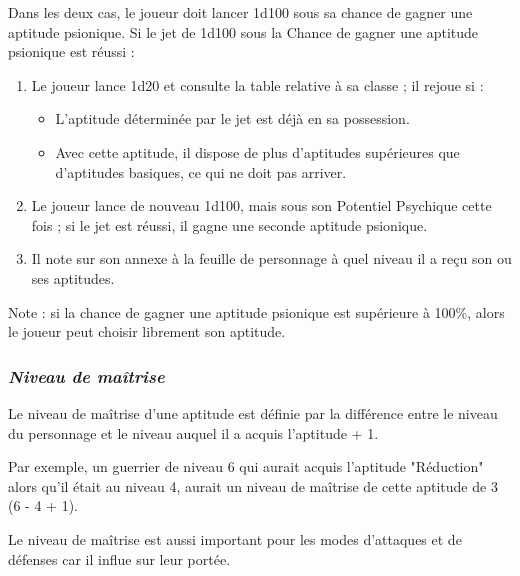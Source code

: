 \bigskip

Dans les deux cas, le joueur doit lancer 1d100 sous sa chance de gagner une aptitude psionique. Si le jet de 1d100 sous la Chance de gagner une aptitude psionique est réussi :

\bigskip

\begin{enumerate}
\item Le joueur lance 1d20 et consulte la table relative à sa classe ; il rejoue si :
\begin{itemize}
\item L'aptitude déterminée par le jet est déjà en sa possession.
\item Avec cette aptitude, il dispose de plus d'aptitudes supérieures que d'aptitudes basiques, ce qui ne doit pas arriver.
\end{itemize}
\item Le joueur lance de nouveau 1d100, mais sous son Potentiel Psychique cette fois ; si le jet est réussi, il gagne une seconde aptitude psionique.
\item Il note sur son annexe à la feuille de personnage à quel niveau il a reçu son ou ses aptitudes. \end{enumerate}

\bigskip

Note : si la chance de gagner une aptitude psionique est supérieure à 100\%, alors le joueur peut choisir librement son aptitude.

\subsubsection*{\textit{Niveau de maîtrise}}
\label{niveau-maitrise}

Le niveau de maîtrise d'une aptitude est définie par la différence entre le niveau du personnage et le niveau auquel il a acquis l'aptitude + 1.

\bigskip

Par exemple, un guerrier de niveau  6 qui aurait acquis l'aptitude "Réduction" alors qu'il était au niveau 4, aurait un niveau de maîtrise de cette aptitude de 3 (6 - 4 + 1).

\bigskip

Le niveau de maîtrise est aussi important pour les modes d'attaques et de défenses car il influe sur leur portée.



